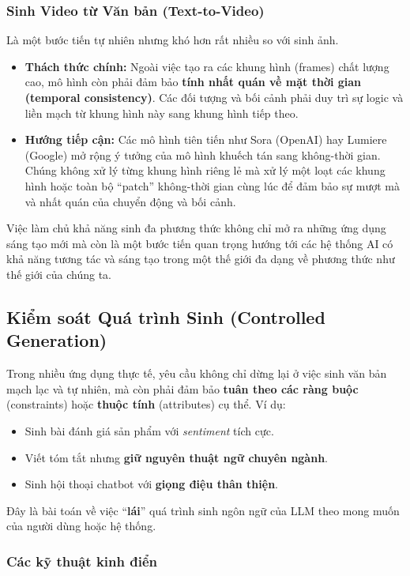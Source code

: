 \subsubsection{Sinh Video từ Văn bản (Text-to-Video)}
Là một bước tiến tự nhiên nhưng khó hơn rất nhiều so với sinh ảnh.
\begin{itemize}
    \item \textbf{Thách thức chính:} Ngoài việc tạo ra các khung hình (frames) chất lượng cao, mô hình còn phải đảm bảo \textbf{tính nhất quán về mặt thời gian (temporal consistency)}. Các đối tượng và bối cảnh phải duy trì sự logic và liền mạch từ khung hình này sang khung hình tiếp theo.
    \item \textbf{Hướng tiếp cận:} Các mô hình tiên tiến như Sora (OpenAI) hay Lumiere (Google) mở rộng ý tưởng của mô hình khuếch tán sang không-thời gian. Chúng không xử lý từng khung hình riêng lẻ mà xử lý một loạt các khung hình hoặc toàn bộ “patch” không-thời gian cùng lúc để đảm bảo sự mượt mà và nhất quán của chuyển động và bối cảnh.
\end{itemize}

Việc làm chủ khả năng sinh đa phương thức không chỉ mở ra những ứng dụng sáng tạo mới mà còn là một bước tiến quan trọng hướng tới các hệ thống AI có khả năng tương tác và sáng tạo trong một thế giới đa dạng về phương thức như thế giới của chúng ta.

\subsection{Kiểm soát Quá trình Sinh (Controlled Generation)}
\label{ssec:controlled_generation}

Trong nhiều ứng dụng thực tế, yêu cầu không chỉ dừng lại ở việc sinh văn bản mạch lạc và tự nhiên, mà còn phải đảm bảo \textbf{tuân theo các ràng buộc} (constraints) hoặc \textbf{thuộc tính} (attributes) cụ thể. Ví dụ:
\begin{itemize}
    \item Sinh bài đánh giá sản phẩm với \textit{sentiment} tích cực.
    \item Viết tóm tắt nhưng \textbf{giữ nguyên thuật ngữ chuyên ngành}.
    \item Sinh hội thoại chatbot với \textbf{giọng điệu thân thiện}.
\end{itemize}

Đây là bài toán về việc ``\textbf{lái}'' quá trình sinh ngôn ngữ của LLM theo mong muốn của người dùng hoặc hệ thống.

\subsubsection{Các kỹ thuật kinh điển}
\label{sssec:classic_controlled_generation}

